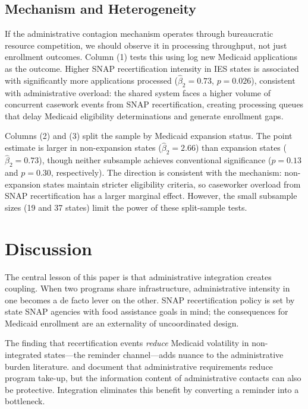\documentclass[12pt]{article}
\begin{document}
\subsection{Mechanism and Heterogeneity}



If the administrative contagion mechanism operates through bureaucratic resource competition, we should observe it in processing throughput, not just enrollment outcomes.  Column (1) tests this using log new Medicaid applications as the outcome. Higher SNAP recertification intensity in IES states is associated with significantly more applications processed ($\hat{\beta}_2 = 0.73$, $p = 0.026$), consistent with administrative overload: the shared system faces a higher volume of concurrent casework events from SNAP recertification, creating processing queues that delay Medicaid eligibility determinations and generate enrollment gaps.

Columns (2) and (3) split the sample by Medicaid expansion status. The point estimate is larger in non-expansion states ($\hat{\beta}_2 = 2.66$) than expansion states ($\hat{\beta}_2 = 0.73$), though neither subsample achieves conventional significance ($p = 0.13$ and $p = 0.30$, respectively). The direction is consistent with the mechanism: non-expansion states maintain stricter eligibility criteria, so caseworker overload from SNAP recertification has a larger marginal effect. However, the small subsample sizes (19 and 37 states) limit the power of these split-sample tests.


\section{Discussion}

The central lesson of this paper is that administrative integration creates coupling. When two programs share infrastructure, administrative intensity in one becomes a de facto lever on the other. SNAP recertification policy is set by state SNAP agencies with food assistance goals in mind; the consequences for Medicaid enrollment are an externality of uncoordinated design.

The finding that recertification events \textit{reduce} Medicaid volatility in non-integrated states---the reminder channel---adds nuance to the administrative burden literature. \citet{herd2018} and \citet{finkelstein2019} document that administrative requirements reduce program take-up, but the information content of administrative contacts can also be protective. Integration eliminates this benefit by converting a reminder into a bottleneck.
\end{document}
